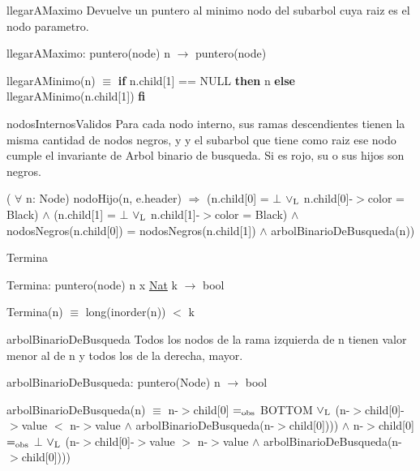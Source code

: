 \begin{DoxyParagraph}{llegar\-A\-Maximo}
\-Devuelve un puntero al minimo nodo del subarbol cuya raiz es el nodo parametro.
\end{DoxyParagraph}
llegar\-A\-Maximo\-: puntero(node) n $\to$ puntero(node)\par
 llegar\-A\-Minimo(n) $\equiv$ {\bfseries if} n.\-child\mbox{[}1\mbox{]} == \-N\-U\-L\-L {\bfseries then} n {\bfseries else} llegar\-A\-Minimo(n.\-child\mbox{[}1\mbox{]}) {\bfseries fi} 

\begin{DoxyParagraph}{nodos\-Internos\-Validos}
\-Para cada nodo interno, sus ramas descendientes tienen la misma cantidad de nodos negros, y y el subarbol que tiene como raiz ese nodo cumple el invariante de \-Arbol binario de busqueda. \-Si es rojo, su o sus hijos son negros.
\end{DoxyParagraph}
( $\forall$ n\-: \-Node) nodo\-Hijo(n, e.\-header) $\Rightarrow$ (n.\-child\mbox{[}0\mbox{]} = $\bot$ $\lor_{\rm L}$ n.\-child\mbox{[}0\mbox{]}-\/$>$color = \-Black) $\land$ (n.\-child\mbox{[}1\mbox{]} = $\bot$ $\lor_{\rm L}$ n.\-child\mbox{[}1\mbox{]}-\/$>$color = \-Black) $\land$ nodos\-Negros(n.\-child\mbox{[}0\mbox{]}) = nodos\-Negros(n.\-child\mbox{[}1\mbox{]}) $\land$ arbol\-Binario\-De\-Busqueda(n)) 

\begin{DoxyParagraph}{\-Termina}

\end{DoxyParagraph}
\-Termina\-: puntero(node) n x \hyperlink{classNat}{\-Nat} k $\to$ bool\par
 \-Termina(n) $\equiv$ long(inorder(n)) $<$ k 

\begin{DoxyParagraph}{arbol\-Binario\-De\-Busqueda}
\-Todos los nodos de la rama izquierda de n tienen valor menor al de n y todos los de la derecha, mayor.
\end{DoxyParagraph}
arbol\-Binario\-De\-Busqueda\-: puntero(\-Node) n $\to$ bool\par
 arbol\-Binario\-De\-Busqueda(n) $\equiv$ n-\/$>$child\mbox{[}0\mbox{]} $=_{\rm obs}$ \-B\-O\-T\-T\-O\-M $\lor_{\rm L}$ (n-\/$>$child\mbox{[}0\mbox{]}-\/$>$value $<$ n-\/$>$value $\land$ arbol\-Binario\-De\-Busqueda(n-\/$>$child\mbox{[}0\mbox{]}))) $\land$ n-\/$>$child\mbox{[}0\mbox{]} $=_{\rm obs}$ $\bot$ $\lor_{\rm L}$ (n-\/$>$child\mbox{[}0\mbox{]}-\/$>$value $>$ n-\/$>$value $\land$ arbol\-Binario\-De\-Busqueda(n-\/$>$child\mbox{[}0\mbox{]}))) 

